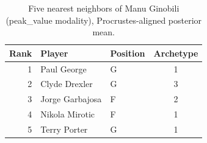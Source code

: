 \begin{table}[htbp]
  \centering\small
  \begin{tabular}{rllc}
    \toprule
    Rank & Player & Position & Archetype \\
    \midrule
    1 & Paul George & G & 1 \\
    2 & Clyde Drexler & G & 3 \\
    3 & Jorge Garbajosa & F & 2 \\
    4 & Nikola Mirotic & F & 1 \\
    5 & Terry Porter & G & 1 \\
    \bottomrule
  \end{tabular}
  \caption{Five nearest neighbors of Manu Ginobili (peak_value modality), Procrustes-aligned posterior mean.}
  \label{tab:Manu_Ginobili_neighbors_peak_value}
\end{table}

